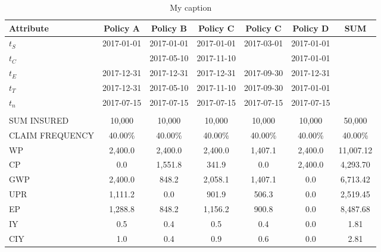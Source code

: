 \documentclass[11pt,a4paper,fleqn]{article}      %
\begin{document}
\begin{table}[H]
\centering
\caption{My caption}
\label{my-label}
\begin{tabular}{|l|c|c|c|c|c|c|}
\hline
Attribute       & Policy A   & Policy B   & Policy C   & Policy C   & Policy D   & SUM                \\ \hline
$t_S$          & 2017-01-01 & 2017-01-01 & 2017-01-01 & 2017-03-01 & 2017-01-01 &                    \\ \cline{1-6}
$t_C$          &            & 2017-05-10 & 2017-11-10 &            & 2017-01-01 &                    \\ \cline{1-6}
$t_E$             & 2017-12-31 & 2017-12-31 & 2017-12-31 & 2017-09-30 & 2017-12-31 &                    \\ \cline{1-6}
$t_T$     & 2017-12-31 & 2017-05-10 & 2017-11-10 & 2017-09-30 & 2017-01-01 &                    \\ \cline{1-6}
$t_n$           & 2017-07-15 & 2017-07-15 & 2017-07-15 & 2017-07-15 & 2017-07-15 & \multirow{-5}{*}{} \\ \hline
                &            &            &            &            &            &                    \\ \hline
SUM INSURED     & 10,000     & 10,000     & 10,000     & 10,000     & 10,000     & 50,000             \\ \hline
\rowcolor[HTML]{3166FF} 
CLAIM FREQUENCY & 40.00\%    & 40.00\%    & 40.00\%    & 40.00\%    & 40.00\%    & 40.00\%            \\ \hline
WP              & 2,400.0    & 2,400.0    & 2,400.0    & 1,407.1    & 2,400.0    & 11,007.12          \\ \hline
CP              & 0.0        & 1,551.8    & 341.9      & 0.0        & 2,400.0    & 4,293.70           \\ \hline
GWP             & 2,400.0    & 848.2      & 2,058.1    & 1,407.1    & 0.0        & 6,713.42           \\ \hline
UPR             & 1,111.2    & 0.0        & 901.9      & 506.3      & 0.0        & 2,519.45           \\ \hline
EP              & 1,288.8    & 848.2      & 1,156.2    & 900.8      & 0.0        & 8,487.68           \\ \hline
IY              & 0.5        & 0.4        & 0.5        & 0.4        & 0.0        & 1.81               \\ \hline
CIY             & 1.0        & 0.4        & 0.9        & 0.6        & 0.0        & 2.81               \\ \hline

\end{tabular}
\end{table}
\end{document}
